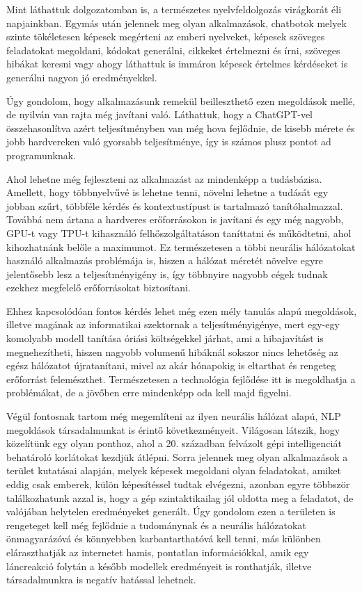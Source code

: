 
Mint láthattuk dolgozatomban is, a természetes nyelvfeldolgozás virágkorát éli napjainkban. Egymás után jelennek meg olyan alkalmazások, chatbotok melyek szinte tökéletesen képesek megérteni az emberi nyelveket, képesek szöveges feladatokat megoldani, kódokat generálni, cikkeket értelmezni és írni, szöveges hibákat keresni vagy ahogy láthattuk is immáron képesek értelmes kérdéseket is generálni nagyon jó eredményekkel. 

Úgy gondolom, hogy alkalmazásunk remekül beilleszthető ezen megoldások mellé, de nyilván van rajta még javítani való. Láthattuk, hogy a ChatGPT-vel összehasonlítva azért teljesítményben van még hova fejlődnie, de kisebb mérete és jobb hardvereken való gyorsabb teljesítménye, így is számos plusz pontot ad programunknak.

Ahol lehetne még fejleszteni az alkalmazást az mindenképp a tudásbázisa. Amellett, hogy többnyelvűvé is lehetne tenni, növelni lehetne a tudását egy jobban szűrt, többféle kérdés és kontextustípust is tartalmazó tanítóhalmazzal. Továbbá nem ártana a hardveres erőforrásokon is javítani és egy még nagyobb, GPU-t vagy TPU-t kihasználó felhőszolgáltatáson taníttatni és működtetni, ahol kihozhatnánk belőle a maximumot. Ez természetesen a többi neurális hálózatokat használó alkalmazás problémája is, hiszen a hálózat méretét növelve egyre jelentősebb lesz a teljesítményigény is, így többnyire nagyobb cégek tudnak ezekhez megfelelő erőforrásokat biztosítani.

Ehhez kapcsolódóan fontos kérdés lehet még ezen mély tanulás alapú megoldások, illetve magának az informatikai szektornak a teljesítményigénye, mert egy-egy komolyabb modell tanítása óriási költségekkel járhat, ami a hibajavítást is megnehezítheti, hiszen nagyobb volumenű hibáknál sokszor nincs lehetőség az egész hálózatot újratanítani, mivel az akár hónapokig is eltarthat és rengeteg erőforrást felemészthet. Természetesen a technológia fejlődése itt is megoldhatja a problémákat, de a jövőben erre mindenképp oda kell majd figyelni.

Végül fontosnak tartom még megemlíteni az ilyen neurális hálózat alapú, NLP megoldások társadalmunkat is érintő következményeit. Világosan látszik, hogy közelítünk egy olyan ponthoz, ahol a 20. században felvázolt gépi intelligenciát behatároló korlátokat kezdjük átlépni. Sorra jelennek meg olyan alkalmazások a terület kutatásai alapján, melyek képesek megoldani olyan feladatokat, amiket eddig csak emberek, külön képesítéssel tudtak elvégezni, azonban egyre többször találkozhatunk azzal is, hogy a gép szintaktikailag jól oldotta meg a feladatot, de valójában helytelen eredményeket generált. Úgy gondolom ezen a területen is rengeteget kell még fejlődnie a tudománynak és a neurális hálózatokat önmagyarázóvá és könnyebben karbantarthatóvá kell tenni, más különben eláraszthatják az internetet hamis, pontatlan információkkal, amik egy láncreakció folytán a később modellek eredményeit is ronthatják, illetve társadalmunkra is negatív hatással lehetnek.

